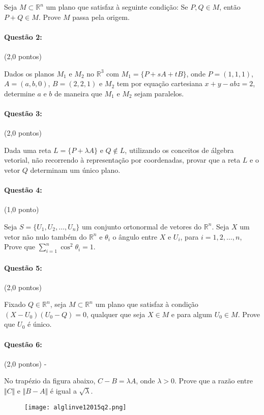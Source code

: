\documentclass[12pt,a4paper]{article}
\begin{document}
Seja $M \subset \mathbb{R}^n$ um plano que satisfaz à seguinte condição: Se $P,Q \in M$, então $P+Q \in M$. Prove $M$ passa pela origem.

\paragraph{Questão 2:} (2,0 pontos)

Dados os planos $M_1$ e $M_2$ no $\mathbb{R}^3$ com $M_1 = \{P+sA+tB\}$, onde $P=(1,1,1)$, $A=(a,b,0)$, $B=(2,2,1)$ e $M_2$ tem por equação cartesiana $x+y-abz=2$, determine $a$ e $b$ de maneira que $M_1$ e $M_2$ sejam paralelos.

\paragraph{Questão 3:} (2,0 pontos) 

Dada uma reta $L=\{P+\lambda A\}$ e $Q \notin L$, utilizando os conceitos de álgebra vetorial, não recorrendo à representação por coordenadas, provar que a reta $L$ e o vetor $Q$ determinam um único plano.

\paragraph{Questão 4:} (1,0 ponto)

Seja $S=\{U_1,U_2,\dots,U_n\}$ um conjunto ortonormal de vetores do $\mathbb{R}^n$. Seja $X$ um vetor não nulo também do $\mathbb{R}^n$ e $\theta_i$ o ângulo entre $X$ e $U_i$, para $i=1,2,\dots,n$, Prove que 
$\sum_{i=1}^{n}\cos^2\theta_i =1$.

\paragraph{Questão 5:} (2,0 pontos) 

Fixado $Q \in \mathbb{R}^n$, seja $M \subset \mathbb{R}^n$ um plano que satisfaz à condição $(X-U_0)(U_0-Q)=0$, qualquer que seja $X \in M$ e para algum $U_0 \in M$. Prove que $U_0$ é único.

\paragraph{Questão 6:} (2,0 pontos) -

No trapézio da figura abaixo, $C-B=\lambda A$, onde $\lambda>0$. Prove que a razão entre $\Vert C \Vert$ e $\Vert B-A \Vert$ é igual a $\sqrt{\lambda}$.

\begin{figure}[ht]
\centering
\texttt{[image: alglinve12015q2.png]}
\end{figure}
\end{document}
